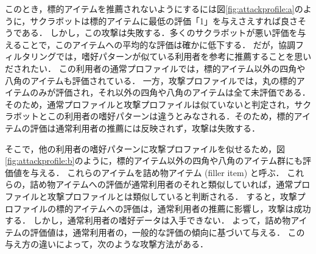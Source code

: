 このとき，標的アイテムを推薦されないようにするには図\ref{fig:attackprofile:a}のように，サクラボットは標的アイテムに最低の評価「1」を与えさえすれば良さそうである．
しかし，この攻撃は失敗する．多くのサクラボットが悪い評価を与えることで，このアイテムへの平均的な評価は確かに低下する．
だが，協調フィルタリングでは，嗜好パターンが似ている利用者を参考に推薦することを思いだされたい．
この利用者の通常プロファイルでは，標的アイテム以外の四角や八角のアイテムも評価されている．
一方，攻撃プロファイルでは，丸の標的アイテムのみが評価され，それ以外の四角や八角のアイテムは全て未評価である．
そのため，通常プロファイルと攻撃プロファイルは似ていないと判定され，サクラボットとこの利用者の嗜好パターンは違うとみなされる．そのため，標的アイテムの評価は通常利用者の推薦には反映されず，攻撃は失敗する．

そこで，他の利用者の嗜好パターンに攻撃プロファイルを似せるため，図\ref{fig:attackprofile:b}のように，標的アイテム以外の四角や八角のアイテム群にも評価値を与える．
これらのアイテムを詰め物アイテム (filler item) と呼ぶ．
これらの，詰め物アイテムへの評価が通常利用者のそれと類似していれば，通常プロファイルと攻撃プロファイルとは類似していると判断される．
すると，攻撃プロファイルの標的アイテムへの評価は，通常利用者の推薦に影響し，攻撃は成功する．
しかし，通常利用者の嗜好データは入手できない．
よって，詰め物アイテムの評価値は，通常利用者の，一般的な評価の傾向に基づいて与える．
この与え方の違いによって，次のような攻撃方法がある．
